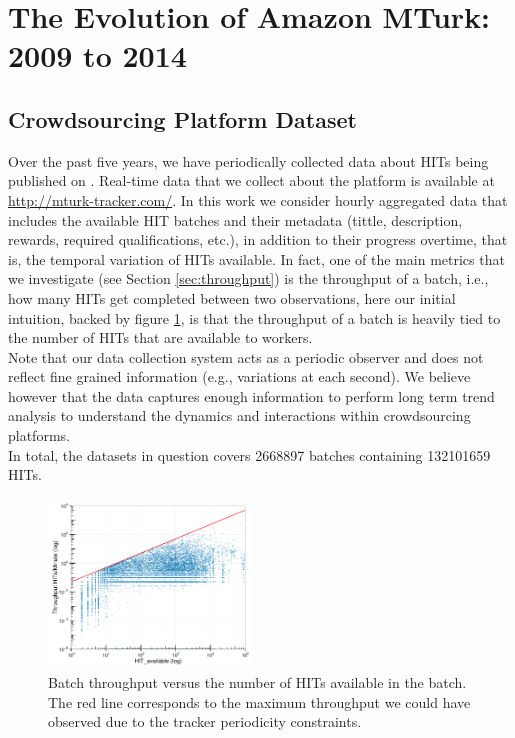 \section{The Evolution of Amazon MTurk: 2009 to 2014}\label{sec:stats}


\subsection{Crowdsourcing Platform Dataset}
\label{sec:tracker}
Over the past five years, we have periodically collected data about HITs being published on \amt{}.
Real-time data that we collect about the platform is available at \url{http://mturk-tracker.com/}. In this work we consider hourly aggregated data that includes the available HIT batches and their metadata (tittle, description, rewards, required qualifications, etc.), in addition to their progress overtime, that is, the temporal variation of HITs available. In fact, one of the main metrics that we investigate (see Section \ref{sec:throughput}) is the throughput of a batch, i.e.,  how many HITs  get completed between two observations, here our initial intuition, backed by figure \ref{fig:motiv}, is that the throughput of a batch is heavily tied to the number of HITs that are available to workers.\\ 
Note that our data collection system acts  as a periodic observer and does not reflect fine grained information (e.g., variations at each second). We believe however that the data captures enough information to perform long term trend analysis to understand the dynamics and interactions within crowdsourcing platforms.\\
In total, the datasets in question covers 2668897 batches containing 132101659 HITs.
\begin{figure}[ht]
	\centering
		\includegraphics[width=0.48\textwidth]{figures/motiv_mturk}
	\caption{Batch throughput versus the number of HITs available in the batch. The red line corresponds to the maximum throughput we could have observed due to the tracker periodicity constraints.\protect\footnotemark}
	\label{fig:motiv}
\end{figure}

